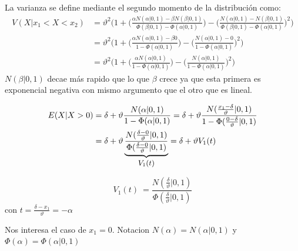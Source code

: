 \documentclass[11pt,twoside, spanish]{report} %
\begin{document}
La varianza se define mediante el segundo momento de la distribuci\'on como:
\begin{equation}\label{eq:variance_aprox_double}
	\begin{split}
		V(X| x_1 < X < x_2) &= \vartheta^2 \Bigg( 1 + \bigg(\frac{\alpha N(\alpha|0,1) - \beta N(\beta|0,1) }{\Phi(\beta|0,1) - \Phi(\alpha|0,1) }\bigg) - \bigg(\frac{N(\alpha|0,1) - N(\beta|0,1) }{\Phi(\beta|0,1) - \Phi(\alpha|0,1) }\bigg)^2 \Bigg)\\
		&=\vartheta^2 \Bigg( 1 + \bigg(\frac{\alpha N(\alpha|0,1) - \beta 0 }{1 - \Phi(\alpha|0,1) }\bigg) - \bigg(\frac{N(\alpha|0,1) - 0 }{1 - \Phi(\alpha|0,1) }\bigg)^2 \Bigg)\\
		&=\vartheta^2 \Bigg( 1 + \bigg(\frac{\alpha N(\alpha|0,1)}{1 - \Phi(\alpha|0,1) }\bigg) - \bigg(\frac{N(\alpha|0,1) }{1 - \Phi(\alpha|0,1) }\bigg)^2 \Bigg)
	\end{split}
\end{equation}
$N(\beta|0,1)$ decae m\'as rapido que lo que $\beta$ crece ya que esta primera es exponencial negativa con mismo argumento que el otro que es lineal.



\begin{equation}\label{eq:mean_aprox_}
	\begin{split}
		E(X|  X > 0)  &= \delta + \vartheta \frac{N(\alpha|0,1)}{1 - \Phi(\alpha|0,1) } = \delta + \vartheta \frac{N(\frac{x_1-\delta}{\vartheta}|0,1)}{1 - \Phi(\frac{0-\delta}{\vartheta}|0,1) }\\
		& = \delta + \vartheta \underbrace{\frac{N(\frac{\delta-0}{\vartheta}|0,1)}{\Phi(\frac{\delta-0}{\vartheta}|0,1) }}_{\text{\small $V_1(t)$} } = \delta + \vartheta V_1(t)
	\end{split}
\end{equation}

\begin{equation}
	V_1(t)\ = \frac{N(\frac{\delta}{\vartheta}|0,1)}{\Phi(\frac{\delta}{\vartheta}|0,1) }
\end{equation}
con $t = \frac{\delta -x_1}{\vartheta} = -\alpha  $

Nos interesa el caso de $x_1=0$. Notacion $N(\alpha)=N(\alpha|0,1)$ y $\Phi(\alpha) = \Phi(\alpha|0,1)$
\end{document}
